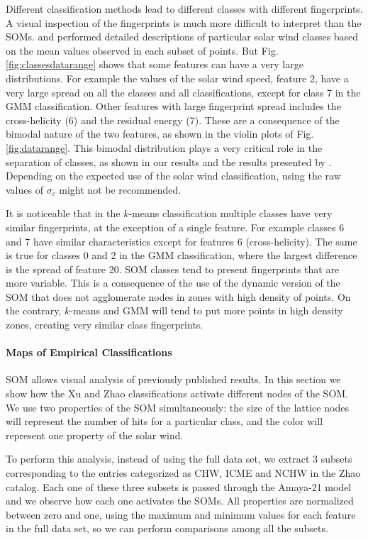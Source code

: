 \documentclass[utf8]{frontiersSCNS} %
\begin{document}
Different classification methods lead to different classes with different fingerprints. A visual inspection of the fingerprints is much more difficult to interpret than the SOMs. \citep{Roberts2020} and \citep{Xu2015b} performed detailed descriptions of particular solar wind classes based on the mean values observed in each subset of points. But Fig.\ref{fig:classesdatarange} shows that some features can have a very large distributions. For example the values of the solar wind speed, feature 2, have a very large spread on all the classes and all classifications, except for class 7 in the GMM classification. Other features with large fingerprint spread includes the cross-helicity (6) and the residual energy (7). These are a consequence of the bimodal nature of the two features, as shown in the violin plots of Fig.\ref{fig:datarange}. This bimodal distribution plays a very critical role in the separation of classes, as shown in our results and the results presented by \citep{Roberts2020}. Depending on the expected use of the solar wind classification, using the raw values of $\sigma_c$ might not be recommended.

It is noticeable that in the $k$-means classification multiple classes have very similar fingerprints, at the exception of a single feature. For example classes 6 and 7 have similar characteristics except for features 6 (cross-helicity). The same is true for classes 0 and 2 in the GMM classification, where the largest difference is the spread of feature 20. SOM classes tend to present fingerprints that are more variable. This is a consequence of the use of the dynamic version of the SOM that does not agglomerate nodes in zones with high density of points. On the contrary, $k$-means and GMM will tend to put more points in high density zones, creating very similar class fingerprints.

\paragraph{Maps of Empirical Classifications}
SOM allows visual analysis of previously published results. In this section we show how the Xu and Zhao classifications activate different nodes of the SOM. We use two properties of the SOM simultaneously: the size of the lattice nodes will represent the number of hits for a particular class, and the color will represent one property of the solar wind.

To perform this analysis, instead of using the full data set, we extract 3 subsets corresponding to the entries categorized as CHW, ICME and NCHW in the Zhao catalog. Each one of these three subsets is passed through the Amaya-21 model and we observe how each one activates the SOMs. All properties are normalized between zero and one, using the maximum and minimum values for each feature in the full data set, so we can perform comparisons among all the subsets.
\end{document}

